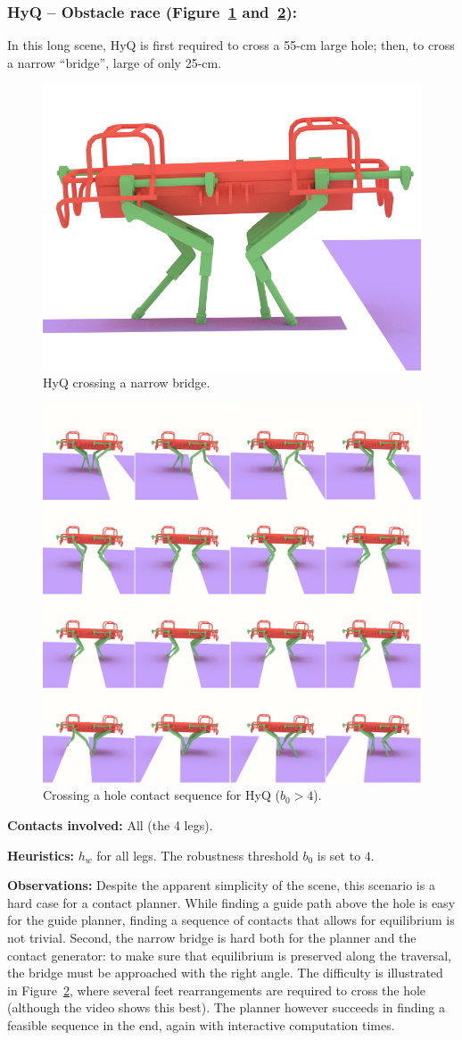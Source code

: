 \subsubsection{HyQ -- Obstacle race (Figure~\ref{fig:HyQ_bridge} and~\ref{fig:HyQ_obs}):}
In this long scene, HyQ is first required to cross a 55-cm large hole; then, to cross a narrow ``bridge'', large of only 25-cm.

\begin{figure}
  \centering
  \includegraphics[width=0.4\linewidth]{figures/HyQ_bridge}
  \caption{
           HyQ crossing a narrow bridge. }
		   \label{fig:HyQ_bridge}
\end{figure}

\begin{figure}
  \centering
  \includegraphics[width=0.5\linewidth]{figures/HyQ_obs}
  \caption{
           Crossing a hole contact sequence for HyQ ($b_0 > 4$). }
		   \label{fig:HyQ_obs}
\end{figure}



\noindent\textbf{Contacts involved:} All (the 4 legs).

\noindent\textbf{Heuristics:} $h_w$ for all legs. The robustness threshold $b_0$ is set to $4$.

\noindent\textbf{Observations:} Despite the apparent simplicity of the scene, this scenario is a hard case for a contact planner.
While finding a guide path above the hole is easy for the guide planner, finding a sequence of contacts that allows for equilibrium is not trivial.
Second, the narrow bridge is hard both for the planner and the contact generator: to make sure that equilibrium is preserved along the traversal,
the bridge must be approached with the right angle.
The difficulty is illustrated in Figure~\ref{fig:HyQ_obs}, where several feet rearrangements are required to cross the hole (although the video shows this best).
The planner however succeeds in finding a feasible sequence in the end, again with interactive computation times.

